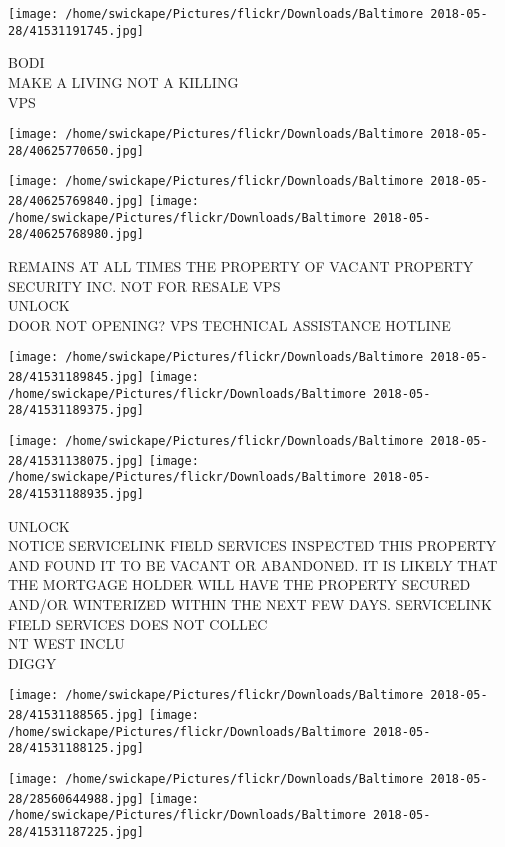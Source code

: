 \documentclass[10pt,letterpaper]{article}
\begin{document}
\texttt{[image: /home/swickape/Pictures/flickr/Downloads/Baltimore 2018-05-28/41531191745.jpg]}

BODI\\
MAKE A LIVING NOT A KILLING\\
VPS\\
\pagebreak

\texttt{[image: /home/swickape/Pictures/flickr/Downloads/Baltimore 2018-05-28/40625770650.jpg]}

\vspace{0.25in}
\texttt{[image: /home/swickape/Pictures/flickr/Downloads/Baltimore 2018-05-28/40625769840.jpg]}
\texttt{[image: /home/swickape/Pictures/flickr/Downloads/Baltimore 2018-05-28/40625768980.jpg]}

REMAINS AT ALL TIMES THE PROPERTY OF VACANT PROPERTY SECURITY INC. NOT FOR RESALE VPS\\
UNLOCK\\
DOOR NOT OPENING?  VPS TECHNICAL ASSISTANCE HOTLINE\\
\pagebreak

\texttt{[image: /home/swickape/Pictures/flickr/Downloads/Baltimore 2018-05-28/41531189845.jpg]}
\texttt{[image: /home/swickape/Pictures/flickr/Downloads/Baltimore 2018-05-28/41531189375.jpg]}

\texttt{[image: /home/swickape/Pictures/flickr/Downloads/Baltimore 2018-05-28/41531138075.jpg]}
\texttt{[image: /home/swickape/Pictures/flickr/Downloads/Baltimore 2018-05-28/41531188935.jpg]}

UNLOCK\\
NOTICE SERVICELINK FIELD SERVICES INSPECTED THIS PROPERTY AND FOUND IT TO BE VACANT OR ABANDONED.  IT IS LIKELY THAT THE MORTGAGE HOLDER WILL HAVE THE PROPERTY SECURED AND/OR WINTERIZED WITHIN THE NEXT FEW DAYS.  SERVICELINK FIELD SERVICES DOES NOT COLLEC\\
NT WEST INCLU\\
DIGGY\\
\pagebreak

\texttt{[image: /home/swickape/Pictures/flickr/Downloads/Baltimore 2018-05-28/41531188565.jpg]}
\texttt{[image: /home/swickape/Pictures/flickr/Downloads/Baltimore 2018-05-28/41531188125.jpg]}

\texttt{[image: /home/swickape/Pictures/flickr/Downloads/Baltimore 2018-05-28/28560644988.jpg]}
\texttt{[image: /home/swickape/Pictures/flickr/Downloads/Baltimore 2018-05-28/41531187225.jpg]}
\end{document}
